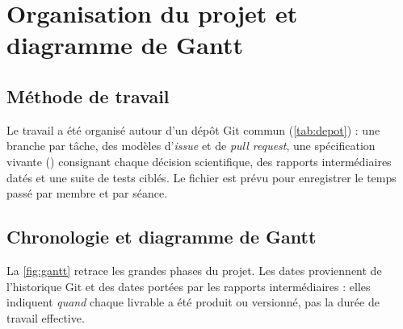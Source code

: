 \clearpage
\section{Organisation du projet et diagramme de Gantt}
\label{sec:organisation}

\subsection{Méthode de travail}

Le travail a été organisé autour d'un dépôt Git commun (\cref{tab:depot}) :
une branche par tâche, des modèles d'\emph{issue} et de \emph{pull request}, une
spécification vivante () consignant chaque décision
scientifique, des rapports intermédiaires datés et une suite de tests ciblés.
Le fichier  est prévu pour enregistrer le temps
passé par membre et par séance.

\subsection{Chronologie et diagramme de Gantt}

La \cref{fig:gantt} retrace les grandes phases du projet. Les dates proviennent
de l'historique Git et des dates portées par les rapports intermédiaires : elles
indiquent \emph{quand} chaque livrable a été produit ou versionné, pas la durée
de travail effective.

